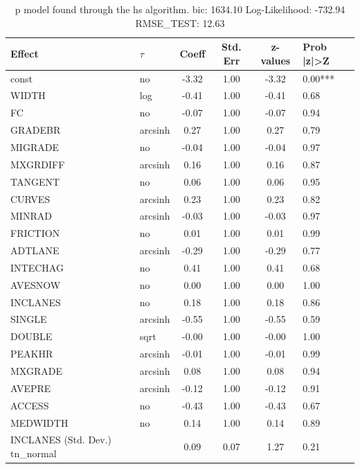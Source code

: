 \begin{table}
	\caption{p model found through the hs algorithm. bic: 1634.10 Log-Likelihood: -732.94 RMSE_TEST: 12.63}
	\begin{center}
		\begin{tabular}{|l|l|c|c|c|l|}
			\hline
			Effect & $\tau$ & Coeff & Std. Err & z-values & Prob |z|>Z \\
			\hline
			const & no & -3.32 & 1.00 & -3.32 & 0.00*** \\
			\hline
			WIDTH & log & -0.41 & 1.00 & -0.41 & 0.68 \\
			\hline
			FC & no & -0.07 & 1.00 & -0.07 & 0.94 \\
			\hline
			GRADEBR & arcsinh & 0.27 & 1.00 & 0.27 & 0.79 \\
			\hline
			MIGRADE & no & -0.04 & 1.00 & -0.04 & 0.97 \\
			\hline
			MXGRDIFF & arcsinh & 0.16 & 1.00 & 0.16 & 0.87 \\
			\hline
			TANGENT & no & 0.06 & 1.00 & 0.06 & 0.95 \\
			\hline
			CURVES & arcsinh & 0.23 & 1.00 & 0.23 & 0.82 \\
			\hline
			MINRAD & arcsinh & -0.03 & 1.00 & -0.03 & 0.97 \\
			\hline
			FRICTION & no & 0.01 & 1.00 & 0.01 & 0.99 \\
			\hline
			ADTLANE & arcsinh & -0.29 & 1.00 & -0.29 & 0.77 \\
			\hline
			INTECHAG & no & 0.41 & 1.00 & 0.41 & 0.68 \\
			\hline
			AVESNOW & no & 0.00 & 1.00 & 0.00 & 1.00 \\
			\hline
			INCLANES & no & 0.18 & 1.00 & 0.18 & 0.86 \\
			\hline
			SINGLE & arcsinh & -0.55 & 1.00 & -0.55 & 0.59 \\
			\hline
			DOUBLE & sqrt & -0.00 & 1.00 & -0.00 & 1.00 \\
			\hline
			PEAKHR & arcsinh & -0.01 & 1.00 & -0.01 & 0.99 \\
			\hline
			MXGRADE & arcsinh & 0.08 & 1.00 & 0.08 & 0.94 \\
			\hline
			AVEPRE & arcsinh & -0.12 & 1.00 & -0.12 & 0.91 \\
			\hline
			ACCESS & no & -0.43 & 1.00 & -0.43 & 0.67 \\
			\hline
			MEDWIDTH & no & 0.14 & 1.00 & 0.14 & 0.89 \\
			\hline
			INCLANES (Std. Dev.) tn_normal &  & 0.09 & 0.07 & 1.27 & 0.21 \\

\end{tabular}
\end{center}
\end{table}
